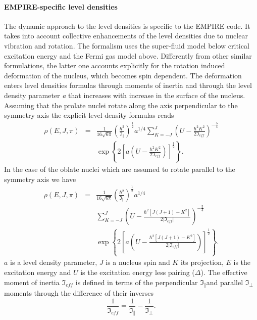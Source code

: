 \documentclass[twocolumn,amsmath,amssymb,10pt,groupedaddress,a4paper]{revtex4}
\begin{document}
\paragraph{EMPIRE-specific level densities}
The dynamic approach to the level densities
is specific to the EMPIRE code. It takes into account collective enhancements
of the level densities due to nuclear vibration and rotation. The
formalism uses the super-fluid model below critical excitation energy
and the Fermi gas model above. Differently from other
similar formulations, the latter one accounts explicitly for the rotation
induced deformation of the nucleus, which becomes spin dependent.
The deformation enters level densities
formulas through moments of inertia and through the level density
parameter \emph{a} that increases with increase in the surface of
the nucleus.
Assuming that the prolate nuclei rotate along the axis perpendicular
to the symmetry axis the explicit level density formulas reads
\begin{eqnarray}
\rho(E,J,\pi) & = & \frac{1}{16\sqrt{6\pi}}\left(\frac{\hbar^{2}}{\Im_{\Vert}}\right)^{\frac{1}{2}}a^{1/4}\sum_{K=-J}^{J}\left(U-\frac{\hbar^{2}K^{2}}{2\Im_{eff}}\right)^{-\frac{5}{4}}\nonumber \\
 &  & \exp\left\{ 2\left[a\left(U-\frac{\hbar^{2}K^{2}}{2\Im_{eff}}\right)\right]^{\frac{1}{2}}\right\} .\label{ro1}
\end{eqnarray}
In the case of the oblate nuclei which are assumed to rotate parallel
to the symmetry axis we have
\begin{eqnarray}
\rho(E,J,\pi) & = & \frac{1}{16\sqrt{6\pi}}\left(\frac{\hbar^{2}}{\Im_{\Vert}}\right)^{\frac{1}{2}}a^{1/4}\nonumber \\
 &  & \sum_{K=-J}^{J}\left(U-\frac{\hbar^{2}\left[J\left(J+1\right)-K^{2}\right]}{2|\Im_{eff}|}\right)^{-\frac{5}{4}}\label{ro2}\\
 &  & \exp\left\{ 2\left[a\left(U-\frac{\hbar^{2}\left[J\left(J+1\right)-K^{2}\right]}{2|\Im_{eff}|}\right)\right]^{\frac{1}{2}}\right\} .\nonumber
 \end{eqnarray}
$a$ is a level density parameter, $J$ is a
nucleus spin and $K$ its projection, $E$ is the excitation energy
and $U$ is the excitation energy less pairing ($\Delta$). The effective
moment of inertia $\Im_{eff}$ is defined in terms of the perpendicular
$\Im_{\Vert}$and parallel $\Im_{\bot}$moments through the difference
of their inverses
\begin{equation}
\frac{1}{\Im_{eff}}=\frac{1}{\Im_{\Vert}}-\frac{1}{\Im_{\bot}}.\label{mom-iner}
\end{equation}
\end{document}
